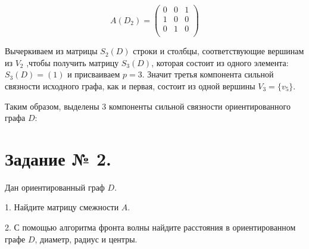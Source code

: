 \documentclass[fleqn]{article}
\begin{document}
$$A(D_2)=
\begin{pmatrix}
0 & 0 & 1 \\
1 & 0 & 0 \\
0 & 1 & 0 \\
\end{pmatrix}
$$

Вычеркиваем из матрицы $S_2(D)$ строки и столбцы, соответствующие вершинам из $V_2$ ,чтобы получить матрицу $S_3(D)$, которая состоит из одного элемента: $S_3(D)=(1)$ и присваиваем $p=3$. Значит третья компонента сильной связности исходного графа, как и первая, состоит из одной вершины $V_3 = \{v_5\}$.

Таким образом, выделены $3$ компоненты сильной связности ориентированного графа $D$:

\medskip


\section*{Задание № 2.}

Дан ориентированный граф $D$.

1. Найдите матрицу смежности $A$.

2. С помощью алгоритма фронта волны найдите расстояния в
ориентированном графе $D$, диаметр, радиус и центры.

\medskip
\end{document}
